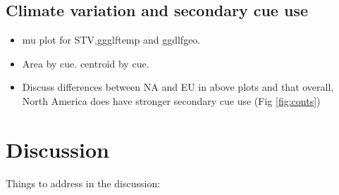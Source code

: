 \documentclass[11pt]{article}\usepackage[]{graphicx}\usepackage[]{color}
\begin{document}
\subsection*{Climate variation and secondary cue use}
\begin{itemize}
\item mu plot for STV,ggglftemp and ggdlfgeo.
\item Area by cue. centroid by cue.
\item Discuss differences between NA and EU in above plots and that overall, North America does have stronger secondary cue use (Fig \ref{fig:conts}) 
\end{itemize}
\section*{Discussion}
Things to address in the discussion:
\end{document}
